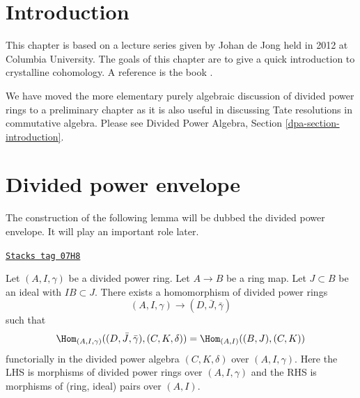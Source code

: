 \section{Introduction}
\label{crystalline-section-introduction}
This chapter is based on a lecture series given by Johan de Jong
held in 2012 at Columbia University.
The goals of this chapter are to give a quick introduction to
crystalline cohomology. A reference is the book \cite{Berthelot}.

\medskip\noindent
We have moved the more elementary purely algebraic discussion of divided
power rings to a preliminary chapter as it is also useful
in discussing Tate resolutions in commutative algebra.
Please see Divided Power Algebra, Section \ref{dpa-section-introduction}.

\section{Divided power envelope}
\label{crystalline-section-divided-power-envelope}
The construction of the following lemma will be dubbed the
divided power envelope. It will play an important role later.

\begin{lemma}
\label{crystalline-lemma-divided-power-envelope}
\href{https://stacks.math.columbia.edu/tag/07H8}{\texttt{Stacks tag 07H8}}

Let $(A, I, \gamma)$ be a divided power ring.
Let $A \to B$ be a ring map. Let $J \subset B$ be an ideal
with $IB \subset J$. There exists a homomorphism of
divided power rings
$$
(A, I, \gamma) \longrightarrow (D, \bar J, \bar \gamma)
$$
such that
$$
\Hom_{(A, I, \gamma)}((D, \bar J, \bar \gamma), (C, K, \delta)) =
\Hom_{(A, I)}((B, J), (C, K))
$$
functorially in the divided power algebra $(C, K, \delta)$ over
$(A, I, \gamma)$. Here the LHS is morphisms of divided
power rings over $(A, I, \gamma)$ and the RHS is morphisms of
(ring, ideal) pairs over $(A, I)$.
\end{lemma}

